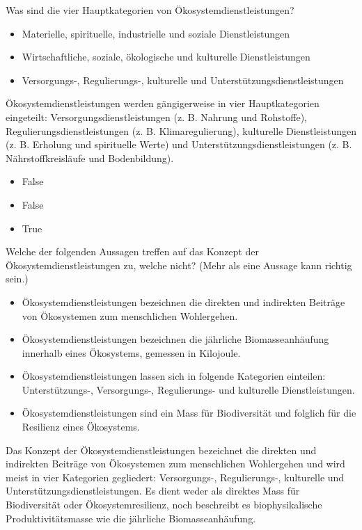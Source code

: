 \documentclass[
  nswissgerman,
  a4paper,
  openany]{book}
\providecommand{\tightlist}{%
  \setlength{\itemsep}{0pt}\setlength{\parskip}{0pt}}
\begin{document}
Was sind die vier Hauptkategorien von Ökosystemdienstleistungen?

\begin{itemize}
\tightlist
\item[$\square$]
  Materielle, spirituelle, industrielle und soziale Dienstleistungen
\item[$\square$]
  Wirtschaftliche, soziale, ökologische und kulturelle Dienstleistungen
\item[$\square$]
  Versorgungs-, Regulierungs-, kulturelle und
  Unterstützungsdienstleistungen
\end{itemize}

Ökosystemdienstleistungen werden gängigerweise in vier Hauptkategorien
eingeteilt: Versorgungsdienstleistungen (z. B. Nahrung und Rohstoffe),
Regulierungsdienstleistungen (z. B. Klimaregulierung), kulturelle
Dienstleistungen (z. B. Erholung und spirituelle Werte) und
Unterstützungsdienstleistungen (z. B. Nährstoffkreisläufe und
Bodenbildung).

\begin{itemize}
\tightlist
\item
  False
\item
  False
\item
  True
\end{itemize}

Welche der folgenden Aussagen treffen auf das Konzept der
Ökosystemdienstleistungen zu, welche nicht? (Mehr als eine Aussage kann
richtig sein.)

\begin{itemize}
\tightlist
\item[$\square$]
  Ökosystemdienstleistungen bezeichnen die direkten und indirekten
  Beiträge von Ökosystemen zum menschlichen Wohlergehen.
\item[$\square$]
  Ökosystemdienstleistungen bezeichnen die jährliche Biomasseanhäufung
  innerhalb eines Ökosystems, gemessen in Kilojoule.
\item[$\square$]
  Ökosystemdienstleistungen lassen sich in folgende Kategorien
  einteilen: Unterstützungs-, Versorgungs-, Regulierungs- und kulturelle
  Dienstleistungen.
\item[$\square$]
  Ökosystemdienstleistungen sind ein Mass für Biodiversität und folglich
  für die Resilienz eines Ökosystems.
\end{itemize}

Das Konzept der Ökosystemdienstleistungen bezeichnet die direkten und
indirekten Beiträge von Ökosystemen zum menschlichen Wohlergehen und
wird meist in vier Kategorien gegliedert: Versorgungs-, Regulierungs-,
kulturelle und Unterstützungsdienstleistungen. Es dient weder als
direktes Mass für Biodiversität oder Ökosystemresilienz, noch beschreibt
es biophysikalische Produktivitätsmasse wie die jährliche
Biomasseanhäufung.
\end{document}

